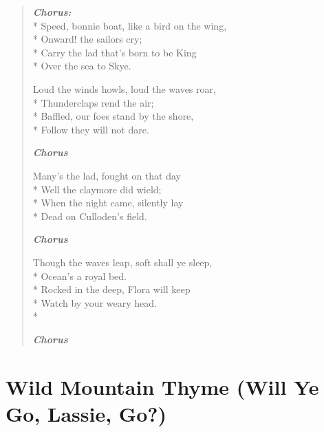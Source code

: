 \documentclass[9pt,twoside]{extarticle}
\newenvironment{xverse}{
	\begin{verse}
	\fontsize{8.5}{10.5}\selectfont
	}
	{
	\end{verse}
	\penalty 0
}
\newcommand{\chorusdef}{\textbf{\emph{Chorus:}}\\*}
\newcommand{\chorusmark}[1][1]{%
\vspace{-0.5\stanzaskip}%
\textbf{\emph{Chorus \ifthenelse{\equal{#1}{1}}{}{$\times$ #1}}}%
\vspace{-0.5\stanzaskip}%
}
\begin{document}
\begin{xverse}
\chorusdef
Speed, bonnie boat, like a bird on the wing, \\*
Onward! the sailors cry; \\*
Carry the lad that’s born to be King \\*
Over the sea to Skye.

Loud the winds howls, loud the waves roar, \\*
Thunderclaps rend the air; \\*
Baffled, our foes stand by the shore, \\*
Follow they will not dare.

\chorusmark

Many’s the lad, fought on that day \\*
Well the claymore did wield; \\*
When the night came, silently lay \\*
Dead on Culloden’s field.

\chorusmark

Though the waves leap, soft shall ye sleep, \\*
Ocean’s a royal bed. \\*
Rocked in the deep, Flora will keep \\*
Watch by your weary head. \\*

\chorusmark
\end{xverse}

\section{Wild Mountain Thyme (Will Ye Go, Lassie, Go?)}
\end{document}

